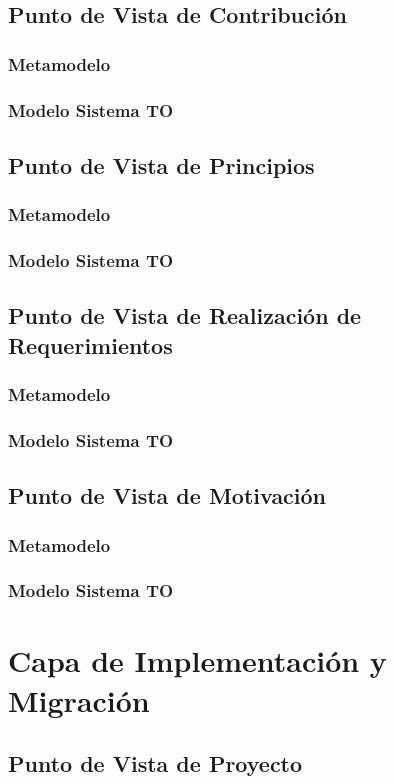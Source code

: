     \subsection{Punto de Vista de Contribución}
		\subsubsection{Metamodelo}
		\subsubsection{Modelo Sistema TO}
    \subsection{Punto de Vista de Principios}
		\subsubsection{Metamodelo}
		\subsubsection{Modelo Sistema TO}
    \subsection{Punto de Vista de Realización de Requerimientos}
		\subsubsection{Metamodelo}
		\subsubsection{Modelo Sistema TO}
    \subsection{Punto de Vista de Motivación}
		\subsubsection{Metamodelo}
		\subsubsection{Modelo Sistema TO}
  \section{Capa de Implementación y Migración}
    \subsection{Punto de Vista de Proyecto}
